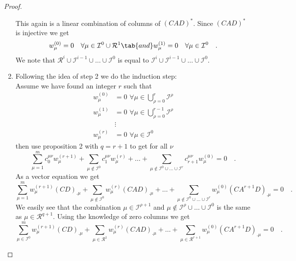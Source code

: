 \begin{proof}
\begin{enumerate}
			This again is a linear combination of columns of $(CAD)^*$. Since $(CAD)^*$ is 
			injective we get
			\begin{equation}
			w_\mu^{(0)} = 0 \quad \forall \mu \in \mathcal{I}^0\cup \mathcal{R}^1 
			\tab{and} w_\mu^{(1)} = 0 \quad \forall\mu \in \mathcal{I}^0	\quad .
			\end{equation}
			We note that $\mathcal{R}^i \cup \mathcal{I}^{i-1}\cup \ldots\cup 
			\mathcal{I}^0$ is 
			equal to $\mathcal{I}^i \cup \mathcal{I}^{i-1}\cup \ldots \cup \mathcal{I}^0$.
	\item Following the idea of step 2 we do the induction step:\\ Assume we have found an 
			integer $r$ such that
			\begin{align*}
			w_\mu^{(0)} &= 0 \,\,
			\forall \mu \in \bigcup\limits_{\rho =0}^r \mathcal{I}^\rho  \\
			w_\mu^{(1)} &= 0 \, \,
			\forall \mu \in \bigcup\limits_{\rho =0}^{r-1} \mathcal{I}^\rho 
			\\	
			&\vdots
			 \\
			w_\mu^{(r)} & = 0 \, \,
			\forall \mu \in  \mathcal{I}^0
			\end{align*}
			then use proposition 2 with $q=r+1$ to get for all $\nu$
			\begin{equation}
			\sum\limits_{\mu=1}^m c_0^{\mu\nu} w_\mu^{(r+1)} + 
			\sum\limits_{\mu \not\in\mathcal{I}^0} c_1^{\mu\nu} w_\mu^{(r)} + 
			\ldots + 
			\sum\limits_{\mu\not\in\mathcal{I}^0\cup\ldots\cup \mathcal{I}^{r}} 
			c_{r+1}^{\mu\nu} w_\mu^{(0)} = 0		\quad .	 
			\end{equation}
			As a vector equation we get
			\begin{equation}
			\sum\limits_{\mu=1}^m w_\mu^{(r+1)} (CD)_{.\mu} + 
			\sum\limits_{\mu\not\in\mathcal{I}^0} w_\mu^{(r)} (CAD)_{.\mu}+ 
			\ldots + 
			\sum\limits_{\mu\not\in\mathcal{I}^0\cup\ldots\cup \mathcal{I}^{r}} 
			w_\mu^{(0)} (CA^{r+1}D)_{.\mu} = 0		\quad .	 
			\end{equation}						
			We easily see that the combination $\mu\in\mathcal{I}^{\rho+1}$ and $\mu\not\in 
			\mathcal{I}^\rho\cup\ldots\cup \mathcal{I}^0$ is the same as $\mu\in
			\mathcal{R}^{q+1}$. Using the knowledge of zero columns we get
			\begin{equation}
			\sum\limits_{\mu\in\mathcal{I}^0}^m w_\mu^{(r+1)} (CD)_{.\mu} + 
			\sum\limits_{\mu\in\mathcal{R}^1} w_\mu^{(r)} (CAD)_{.\mu}+ 
			\ldots + 
			\sum\limits_{\mu\in\mathcal{R}^{r+1}} 
			w_\mu^{(0)} (CA^{r+1}D)_{.\mu} = 0		\quad .	 

\end{equation}
\end{enumerate}
\end{proof}
